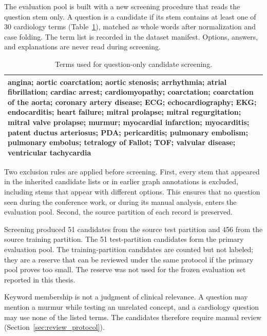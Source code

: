 The evaluation pool is built with a new screening procedure that reads the question stem only. A question is a candidate if its stem contains at least one of 30 cardiology terms (Table~\ref{tab:screening_terms}), matched as whole words after normalization and case folding. The term list is recorded in the dataset manifest. Options, answers, and explanations are never read during screening.

\begin{table}[H]
\centering
\caption{Terms used for question-only candidate screening.}
\label{tab:screening_terms}
\small
\begin{tabularx}{\linewidth}{>{\raggedright\arraybackslash}X}
\toprule
angina; aortic coarctation; aortic stenosis; arrhythmia; atrial fibrillation; cardiac arrest; cardiomyopathy; coarctation; coarctation of the aorta; coronary artery disease; ECG; echocardiography; EKG; endocarditis; heart failure; mitral prolapse; mitral regurgitation; mitral valve prolapse; murmur; myocardial infarction; myocarditis; patent ductus arteriosus; PDA; pericarditis; pulmonary embolism; pulmonary embolus; tetralogy of Fallot; TOF; valvular disease; ventricular tachycardia \\
\bottomrule
\end{tabularx}
\end{table}

Two exclusion rules are applied before screening. First, every stem that appeared in the inherited candidate lists or in earlier graph annotations is excluded, including stems that appear with different options. This ensures that no question seen during the conference work, or during its manual analysis, enters the evaluation pool. Second, the source partition of each record is preserved.

Screening produced 51 candidates from the source test partition and 456 from the source training partition. The 51 test-partition candidates form the primary evaluation pool. The training-partition candidates are counted but not labeled; they are a reserve that can be reviewed under the same protocol if the primary pool proves too small. The reserve was not used for the frozen evaluation set reported in this thesis.

Keyword membership is not a judgment of clinical relevance. A question may mention a murmur while testing an unrelated concept, and a cardiology question may use none of the listed terms. The candidates therefore require manual review (Section~\ref{sec:review_protocol}).

